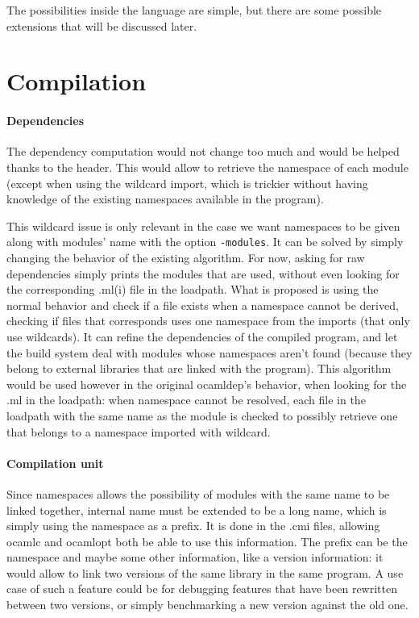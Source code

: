 \documentclass[11pt,a4paper]{article}
\begin{document}
The possibilities inside the language are simple, but there are some possible
extensions that will be discussed later.

\section{Compilation}

\paragraph{Dependencies}

The dependency computation would not change too much and would be helped thanks
to the header. This would allow to retrieve the namespace of each module (except
when using the wildcard import, which is trickier without having knowledge of
the existing namespaces available in the program).

This wildcard issue is only relevant in the case we want namespaces to be given
along with modules' name with the option \texttt{-modules}. It can be solved by
simply changing the behavior of the existing algorithm. For now, asking for raw
dependencies simply prints the modules that are used, without even looking for
the corresponding .ml(i) file in the loadpath. What is proposed is using the
normal behavior and check if a file exists when a namespace cannot be derived,
checking if files that corresponds uses one namespace from the imports (that
only use wildcards). It can refine the dependencies of the compiled program, and
let the build system deal with modules whose namespaces aren't found (because
they belong to external libraries that are linked with the program). This
algorithm would be used however in the original ocamldep's behavior, when
looking for the .ml in the loadpath: when namespace cannot be resolved, each file
in the loadpath with the same name as the module is checked to possibly retrieve
one that belongs to a namespace imported with wildcard.


\paragraph{Compilation unit}

Since namespaces allows the possibility of modules with the same name to be
linked together, internal name must be extended to be a long name, which is simply
using the namespace as a prefix. It is done in the .cmi files, allowing ocamlc
and ocamlopt both be able to use this information. The prefix can be the
namespace and maybe some other information, like a version information: it would
allow to link two versions of the same library in the same program. A use case
of such a feature could be for debugging features that have been rewritten
between two versions, or simply benchmarking a new version against the old one.
\end{document}
